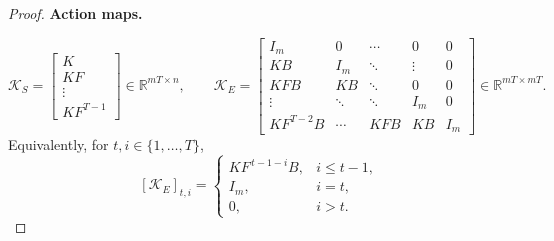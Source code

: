 \begin{proof}
    \medskip
    \noindent\textbf{Action maps.}
  
    \[
    \mathcal K_S=
    \begin{bmatrix}
    K\\[2pt] KF\\[-2pt]\vdots\\[2pt] KF^{T-1}
    \end{bmatrix}\!\in\mathbb R^{mT\times n},
    \qquad
    \mathcal K_E=
    \begin{bmatrix}
    I_m&0&\cdots&0&0\\
    KB&I_m&\ddots&\vdots&0\\
    KFB&KB&\ddots&0&0\\
    \vdots&\ddots&\ddots&I_m&0\\
    KF^{T-2}B&\cdots&KFB& KB&I_m
    \end{bmatrix}\!\in\mathbb R^{mT\times mT}.
    \]
    Equivalently, for \(t,i\in\{1,\ldots,T\}\),
    \[
    [\mathcal K_E]_{t,i}=
    \begin{cases}
    K F^{\,t-1-i} B,& i\le t-1,\\[2pt]
    I_m,& i=t,\\[2pt]
    0,& i>t.
    \end{cases}
    \]
\end{proof}








    



